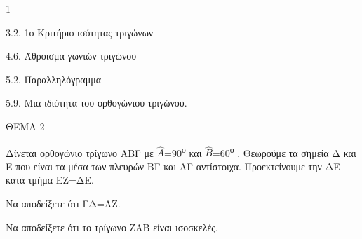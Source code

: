 \begin{ylh}{1}
    \item 3.2. 1ο Κριτήριο ισότητας τριγώνων
    \item 4.6. Άθροισμα γωνιών τριγώνου
    \item 5.2. Παραλληλόγραμμα
    \item 5.9. Μια ιδιότητα του ορθογώνιου τριγώνου.
\end{ylh}

ΘΕΜΑ 2

Δίνεται ορθογώνιο τρίγωνο ΑΒΓ με $\widehat{A}$=90\textsuperscript{ο} και $\widehat{B}$=60\textsuperscript{ο} . Θεωρούμε τα σημεία Δ και Ε που είναι τα μέσα των πλευρών ΒΓ και ΑΓ αντίστοιχα. Προεκτείνουμε την ΔΕ κατά τμήμα ΕΖ=ΔΕ.

\begin{alist}
\item Να αποδείξετε ότι ΓΔ=ΑΖ. 

\item Να αποδείξετε ότι το τρίγωνο ΖΑΒ είναι ισοσκελές. 


\begin{center}
\end{center}
\end{alist}
